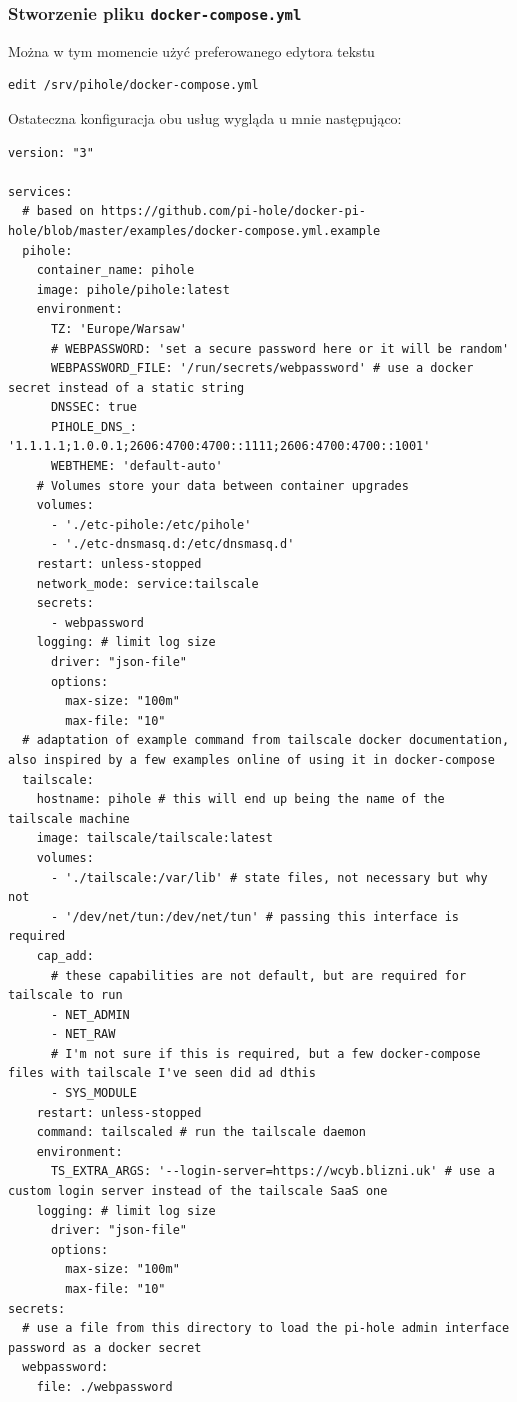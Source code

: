 \documentclass{report}
\numberwithin{equation}{section}
\begin{document}
\subsubsection{Stworzenie pliku \texttt{docker-compose.yml}}
Można w tym momencie użyć preferowanego edytora tekstu
\begin{verbatim}
edit /srv/pihole/docker-compose.yml
\end{verbatim}
\begin{samepage}
Ostateczna konfiguracja obu usług wygląda u mnie następująco:
\begin{verbatim}
version: "3"

services:
  # based on https://github.com/pi-hole/docker-pi-hole/blob/master/examples/docker-compose.yml.example
  pihole:
    container_name: pihole
    image: pihole/pihole:latest
    environment:
      TZ: 'Europe/Warsaw'
      # WEBPASSWORD: 'set a secure password here or it will be random'
      WEBPASSWORD_FILE: '/run/secrets/webpassword' # use a docker secret instead of a static string
      DNSSEC: true
      PIHOLE_DNS_: '1.1.1.1;1.0.0.1;2606:4700:4700::1111;2606:4700:4700::1001'
      WEBTHEME: 'default-auto'
    # Volumes store your data between container upgrades
    volumes:
      - './etc-pihole:/etc/pihole'
      - './etc-dnsmasq.d:/etc/dnsmasq.d'
    restart: unless-stopped
    network_mode: service:tailscale
    secrets:
      - webpassword
    logging: # limit log size
      driver: "json-file"
      options:
        max-size: "100m"
        max-file: "10"
  # adaptation of example command from tailscale docker documentation, also inspired by a few examples online of using it in docker-compose
  tailscale:
    hostname: pihole # this will end up being the name of the tailscale machine
    image: tailscale/tailscale:latest
    volumes:
      - './tailscale:/var/lib' # state files, not necessary but why not
      - '/dev/net/tun:/dev/net/tun' # passing this interface is required
    cap_add:
      # these capabilities are not default, but are required for tailscale to run
      - NET_ADMIN
      - NET_RAW
      # I'm not sure if this is required, but a few docker-compose files with tailscale I've seen did ad dthis
      - SYS_MODULE
    restart: unless-stopped
    command: tailscaled # run the tailscale daemon
    environment:
      TS_EXTRA_ARGS: '--login-server=https://wcyb.blizni.uk' # use a custom login server instead of the tailscale SaaS one
    logging: # limit log size
      driver: "json-file"
      options:
        max-size: "100m"
        max-file: "10"
secrets:
  # use a file from this directory to load the pi-hole admin interface password as a docker secret
  webpassword:
    file: ./webpassword
\end{verbatim}
\end{samepage}
\end{document}
